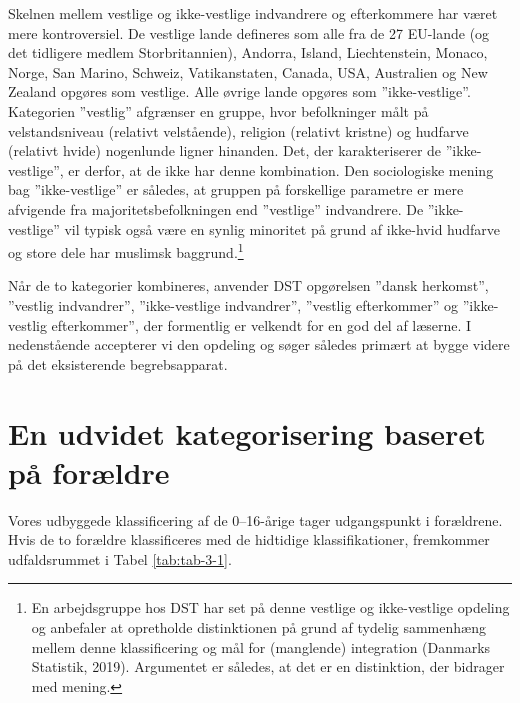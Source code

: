 \documentclass[
]{book}
\begin{document}
Skelnen mellem vestlige og ikke-vestlige indvandrere og efterkommere har været mere kontroversiel. De vestlige lande defineres som alle fra de 27 EU-lande (og det tidligere medlem Storbritannien), Andorra, Island, Liechtenstein, Monaco, Norge, San Marino, Schweiz, Vatikanstaten, Canada, USA, Australien og New Zealand opgøres som vestlige. Alle øvrige lande opgøres som ''ikke-vestlige''. Kategorien ''vestlig'' afgrænser en gruppe, hvor befolkninger målt på velstandsniveau (relativt velstående), religion (relativt kristne) og hudfarve (relativt hvide) nogenlunde ligner hinanden. Det, der karakteriserer de ''ikke-vestlige'', er derfor, at de ikke har denne kombination. Den sociologiske mening bag ''ikke-vestlige'' er således, at gruppen på forskellige parametre er mere afvigende fra majoritetsbefolkningen end ''vestlige'' indvandrere. De ''ikke-vestlige'' vil typisk også være en synlig minoritet på grund af ikke-hvid hudfarve og store dele har muslimsk baggrund.\footnote{En arbejdsgruppe hos DST har set på denne vestlige og ikke-vestlige opdeling og anbefaler at opretholde distinktionen på grund af tydelig sammenhæng mellem denne klassificering og mål for (manglende) integration (Danmarks Statistik, 2019). Argumentet er således, at det er en distinktion, der bidrager med mening.}

Når de to kategorier kombineres, anvender DST opgørelsen ''dansk herkomst'', ''vestlig indvandrer'', ''ikke-vestlige indvandrer'', ''vestlig efterkommer'' og ''ikke-vestlig efterkommer'', der formentlig er velkendt for en god del af læserne. I nedenstående accepterer vi den opdeling og søger således primært at bygge videre på det eksisterende begrebsapparat.

\section{En udvidet kategorisering baseret på forældre}\label{en-udvidet-kategorisering-baseret-puxe5-foruxe6ldre}

Vores udbyggede klassificering af de 0--16-årige tager udgangspunkt i forældrene. Hvis de to forældre klassificeres med de hidtidige klassifikationer, fremkommer udfaldsrummet i Tabel \ref{tab:tab-3-1}.
\end{document}
